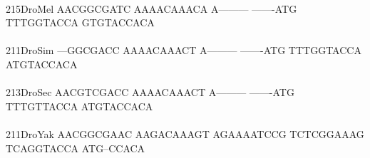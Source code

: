 \documentclass[11pt,twoside,reqno,a4paper]{article}
\begin{document}
{\\
215\hspace*{2\charwidth}DroMel	AACGGCGATC	AAAACAAACA	A---------	-------ATG	TTTGGTACCA	GTGTACCACA	\\
\hspace*{5\charwidth}\hspace*{7\charwidth}\hspace*{1\charwidth}\hspace*{1\charwidth}\hspace*{1\charwidth}\hspace*{1\charwidth}\hspace*{1\charwidth}\hspace*{1\charwidth}\\
211\hspace*{2\charwidth}DroSim	---GGCGACC	AAAACAAACT	A---------	-------ATG	TTTGGTACCA	ATGTACCACA	\\
\hspace*{5\charwidth}\hspace*{7\charwidth}\hspace*{1\charwidth}\hspace*{1\charwidth}\hspace*{1\charwidth}\hspace*{1\charwidth}\hspace*{1\charwidth}\hspace*{1\charwidth}\\
213\hspace*{2\charwidth}DroSec	AACGTCGACC	AAAACAAACT	A---------	-------ATG	TTTGTTACCA	ATGTACCACA	\\
\hspace*{5\charwidth}\hspace*{7\charwidth}\hspace*{1\charwidth}\hspace*{1\charwidth}\hspace*{1\charwidth}\hspace*{1\charwidth}\hspace*{1\charwidth}\hspace*{1\charwidth}\\
211\hspace*{2\charwidth}DroYak	AACGGCGAAC	AAGACAAAGT	AGAAAATCCG	TCTCGGAAAG	TCAGGTACCA	ATG--CCACA	\\
\hspace*{5\charwidth}\hspace*{7\charwidth}\hspace*{1\charwidth}\hspace*{1\charwidth}\hspace*{1\charwidth}\hspace*{1\charwidth}\hspace*{1\charwidth}\hspace*{1\charwidth}\\
}
\end{document}
